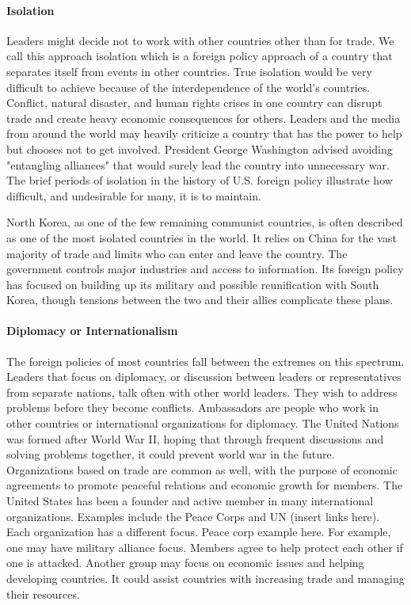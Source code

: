 \paragraph{Isolation} Leaders might decide not to work with other countries
other than for trade. We call this approach isolation which is a foreign policy
approach of a country that separates itself from events in other countries. True
isolation would be very difficult to achieve because of the interdependence of
the world's countries. Conflict, natural disaster, and human rights crises in
one country can disrupt trade and create heavy economic consequences for others.
Leaders and the media from around the world may heavily criticize a country that
has the power to help but chooses not to get involved. President George
Washington advised avoiding "entangling alliances" that would surely lead the
country into unnecessary war. The brief periods of isolation in the history of
U.S. foreign policy illustrate how difficult, and undesirable for many, it is to
maintain.

North Korea, as one of the few remaining communist countries, is often described
as one of the most isolated countries in the world. It relies on China for the
vast majority of trade and limits who can enter and leave the country. The
government controls major industries and access to information. Its foreign
policy has focused on building up its military and possible reunification with
South Korea, though tensions between the two and their allies complicate these
plans.

\paragraph{Diplomacy or Internationalism} The foreign policies of most countries
fall between the extremes on this spectrum. Leaders that focus on diplomacy, or
discussion between leaders or representatives from separate nations, talk often
with other world leaders. They wish to address problems before they become
conflicts. Ambassadors are people who work in other countries or international
organizations for diplomacy. The United Nations was formed after World War II,
hoping that through frequent discussions and solving problems together, it could
prevent world war in the future. Organizations based on trade are common as
well, with the purpose of economic agreements to promote peaceful relations and
economic growth for members. The United States has been a founder and active
member in many international organizations. Examples include the Peace Corps and
UN (insert links here). Each organization has a different focus. Peace corp
example here. For example, one may have military alliance focus. Members agree
to help protect each other if one is attacked. Another group may focus on
economic issues and helping developing countries. It could assist countries with
increasing trade and managing their resources.

